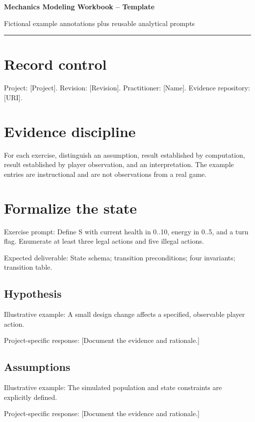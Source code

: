 \documentclass[11pt]{article}
\begin{document}
{\huge\bfseries\color{suiteblue} Mechanics Modeling Workbook -- Template}\par
\vspace{0.15in}
{\normalsize\color{suitegray} Fictional example annotations plus reusable analytical prompts}\par
\vspace{0.15in}\hrule\vspace{0.15in}

\section{Record control}
Project: [Project]. Revision: [Revision]. Practitioner: [Name]. Evidence repository: [URI].


\section{Evidence discipline}
For each exercise, distinguish an assumption, result established by computation, result established by player observation, and an interpretation. The example entries are instructional and are not observations from a real game.


\section{Formalize the state}
Exercise prompt: Define S with current health in 0..10, energy in 0..5, and a turn flag. Enumerate at least three legal actions and five illegal actions.

Expected deliverable: State schema; transition preconditions; four invariants; transition table.


\subsection{Hypothesis}
Illustrative example: A small design change affects a specified, observable player action.

Project-specific response: [Document the evidence and rationale.]


\subsection{Assumptions}
Illustrative example: The simulated population and state constraints are explicitly defined.

Project-specific response: [Document the evidence and rationale.]
\end{document}
